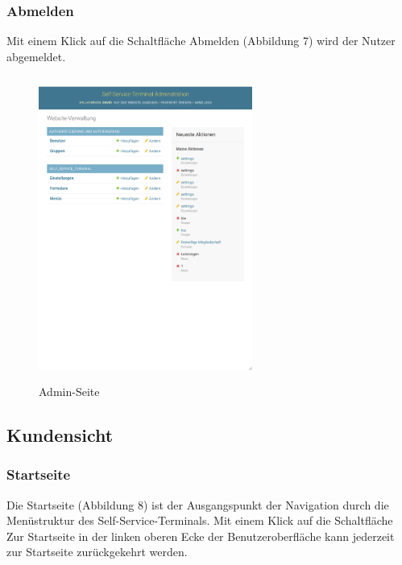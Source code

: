\subsubsection{Abmelden} Mit einem Klick auf die Schaltfläche \glqq Abmelden\grqq{} (Abbildung 7) wird der Nutzer abgemeldet.

\begin{figure}[htp]
    \centering
    \includegraphics[width=7cm , height=10cm]{Bilder/AdminSeite.png}
    \caption[Startseite des Self-Service-Terminals]{Admin-Seite}
    \label{fig:SSTAdminSeite}
\end{figure}

\newpage

\subsection{Kundensicht}


\subsubsection{Startseite} Die Startseite (Abbildung 8) ist der Ausgangspunkt der Navigation durch die Menüstruktur des Self-Service-Terminals. Mit einem Klick auf die Schaltfläche \glqq Zur Startseite\grqq{} in der linken oberen Ecke der Benutzeroberfläche kann jederzeit zur Startseite zurückgekehrt werden.

